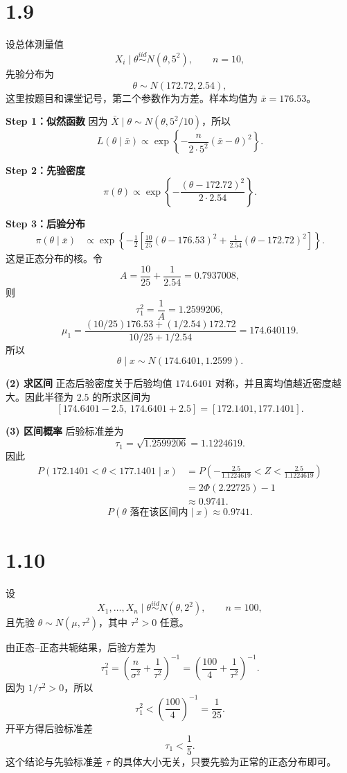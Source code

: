 \documentclass[UTF8,zihao=-4]{ctexart}
\begin{document}
\section*{1.9}
设总体测量值
\[
X_i\mid\theta\overset{iid}{\sim}N(\theta,5^2),\qquad n=10,
\]
先验分布为
\[
\theta\sim N(172.72,2.54),
\]
这里按题目和课堂记号，第二个参数作为方差。样本均值为 \(\bar x=176.53\)。

\textbf{Step 1：似然函数}
因为 \(\bar X\mid\theta\sim N(\theta,5^2/10)\)，所以
\[
L(\theta\mid\bar x)\propto
\exp\left\{-\frac{n}{2\cdot5^2}(\bar x-\theta)^2\right\}.
\]

\textbf{Step 2：先验密度}
\[
\pi(\theta)\propto
\exp\left\{-\frac{(\theta-172.72)^2}{2\cdot2.54}\right\}.
\]

\textbf{Step 3：后验分布}
\[
\begin{aligned}
\pi(\theta\mid\bar x)&\propto
\exp\left\{-\frac12\left[\frac{10}{25}(\theta-176.53)^2
+\frac1{2.54}(\theta-172.72)^2\right]\right\}.
\end{aligned}
\]
这是正态分布的核。令
\[
A=\frac{10}{25}+\frac1{2.54}=0.7937008,
\]
则
\[
\tau_1^2=\frac1A=1.2599206,
\]
\[
\mu_1=\frac{(10/25)176.53+(1/2.54)172.72}{10/25+1/2.54}
=174.640119.
\]
所以
\[
\boxed{\theta\mid x\sim N(174.6401,1.2599).}
\]

\textbf{(2) 求区间}
正态后验密度关于后验均值 \(174.6401\) 对称，并且离均值越近密度越大。因此半径为 \(2.5\) 的所求区间为
\[
\boxed{[174.6401-2.5,\ 174.6401+2.5]
=[172.1401,177.1401].}
\]

\textbf{(3) 区间概率}
后验标准差为
\[
\tau_1=\sqrt{1.2599206}=1.1224619.
\]
因此
\[
\begin{aligned}
P(172.1401<\theta<177.1401\mid x)
&=P\left(-\frac{2.5}{1.1224619}<Z<\frac{2.5}{1.1224619}\right)\\
&=2\Phi(2.22725)-1\\
&\approx0.9741.
\end{aligned}
\]
\[
\boxed{P(\theta\text{ 落在该区间内}\mid x)\approx0.9741.}
\]

\section*{1.10}
设
\[
X_1,\ldots,X_n\mid\theta\overset{iid}{\sim}N(\theta,2^2),\qquad n=100,
\]
且先验 \(\theta\sim N(\mu,\tau^2)\)，其中 \(\tau^2>0\) 任意。

由正态--正态共轭结果，后验方差为
\[
\tau_1^2=\left(\frac n{\sigma^2}+\frac1{\tau^2}\right)^{-1}
=\left(\frac{100}{4}+\frac1{\tau^2}\right)^{-1}.
\]
因为 \(1/\tau^2>0\)，所以
\[
\tau_1^2<\left(\frac{100}{4}\right)^{-1}=\frac1{25}.
\]
开平方得后验标准差
\[
\boxed{\tau_1<\frac15.}
\]
这个结论与先验标准差 \(\tau\) 的具体大小无关，只要先验为正常的正态分布即可。
\end{document}
